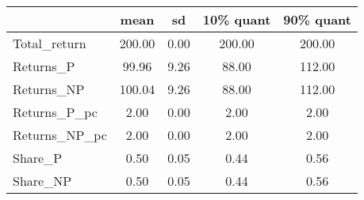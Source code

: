 \begin{tabular}{lcccc}
\toprule
{} &    mean &    sd &  10\% quant &  90\% quant \\
\midrule
Total\_return  &  200.00 &  0.00 &     200.00 &     200.00 \\
Returns\_P     &   99.96 &  9.26 &      88.00 &     112.00 \\
Returns\_NP    &  100.04 &  9.26 &      88.00 &     112.00 \\
Returns\_P\_pc  &    2.00 &  0.00 &       2.00 &       2.00 \\
Returns\_NP\_pc &    2.00 &  0.00 &       2.00 &       2.00 \\
Share\_P       &    0.50 &  0.05 &       0.44 &       0.56 \\
Share\_NP      &    0.50 &  0.05 &       0.44 &       0.56 \\
\bottomrule
\end{tabular}
